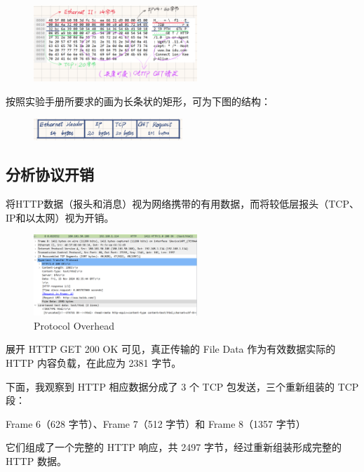 \documentclass[14pt,a4paper,UTF8,twoside]{article}
\begin{document}
\begin{figure}[H]
  \centering
  \includegraphics[width=0.55\textwidth]{lab1/structureanalysis.png}
\end{figure}

按照实验手册所要求的画为长条状的矩形，可为下图的结构：

\begin{figure}[H]
  \centering
  \includegraphics[width=0.5\textwidth]{lab1/structure.png}
\end{figure}

\subsection{分析协议开销}

将HTTP数据（报头和消息）视为网络携带的有用数据，而将较低层报头（TCP、IP和以太网）视为开销。

\begin{figure}[H]
  \centering
  \includegraphics[width=0.55\textwidth]{lab1/cost.png}
  \caption{Protocol Overhead}
\end{figure}

展开 HTTP GET 200 OK 可见，真正传输的 File Data 作为有效数据实际的 HTTP 内容负载，在此应为 2381 字节。

下面，我观察到 HTTP 相应数据分成了 3 个 TCP 包发送，三个重新组装的 TCP 段：

\begin{center}
Frame 6（628 字节）、Frame 7（512 字节）和 Frame 8（1357 字节）
\end{center}

它们组成了一个完整的 HTTP 响应，共 2497 字节，经过重新组装形成完整的 HTTP 数据。
\end{document}

